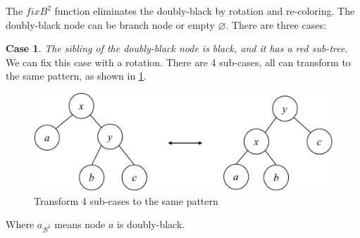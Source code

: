 \documentclass[b5paper]{article}
\begin{document}
The $fixB^2$ function eliminates the doubly-black by rotation and re-coloring. The doubly-black node can be branch node or empty $\pmb{\varnothing}$. There are three cases:

\textbf{Case 1}. {\em The sibling of the doubly-black node is black, and it has a red sub-tree.} We can fix this case with a rotation. There are 4 sub-cases, all can transform to the same pattern, as shown in \cref{fig:del-case1}.

\begin{figure}[htbp]
  \centering
  \includegraphics[scale=0.4, page=3]{img/rbtree}
  \caption{Transform 4 sub-cases to the same pattern}
  \label{fig:del-case1}
\end{figure}

\be
{}
\label{eq:db-case-1}
\ee

Where $a_{\mathcal{B}^2}$ means node $a$ is doubly-black.
\end{document}
